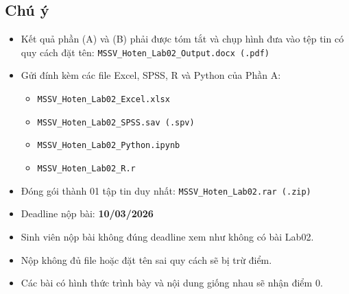 \newpage
\subsection*{Chú ý}

\begin{itemize}
\item Kết quả phần (A) và (B) phải được tóm tắt và chụp hình đưa vào tệp tin có quy cách đặt tên:
\texttt{MSSV\_Hoten\_Lab02\_Output.docx (.pdf)}
\item Gửi đính kèm các file Excel, SPSS, R và Python của Phần A:
\begin{itemize}
\item \texttt{MSSV\_Hoten\_Lab02\_Excel.xlsx}
\item \texttt{MSSV\_Hoten\_Lab02\_SPSS.sav (.spv)}
\item \texttt{MSSV\_Hoten\_Lab02\_Python.ipynb}
\item \texttt{MSSV\_Hoten\_Lab02\_R.r}
\end{itemize}
\item Đóng gói thành 01 tập tin duy nhất:
\texttt{MSSV\_Hoten\_Lab02.rar (.zip)}
\item Deadline nộp bài: \textbf{10/03/2026}
\item Sinh viên nộp bài không đúng deadline xem như không có bài Lab02.
\item Nộp không đủ file hoặc đặt tên sai quy cách sẽ bị trừ điểm.
\item Các bài có hình thức trình bày và nội dung giống nhau sẽ nhận điểm 0.
\end{itemize}